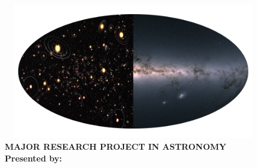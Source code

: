 \begin{titlepage}
	\begin{addmargin}[-1cm]{-3cm}
    \begin{center}
        \large  

        \hfill

        \vfill

		
		
		
		\vspace{1cm}


        \begingroup
            
            \emph{\color{halfgray} }\\ \bigskip
                        
        \endgroup
       
        \includegraphics[width=11.5cm,height=6cm]{gfx/EXO_4.png} \\   
        
		\vspace{0.5cm}
		\medskip
		\small \textbf{MAJOR RESEARCH PROJECT IN ASTRONOMY}\\
		\vspace{1.0cm}
		\textbf{Presented by:}\\
        \spacedlowsmallcaps{\myName}
      


\end{center}
\end{addmargin}
\end{titlepage}
